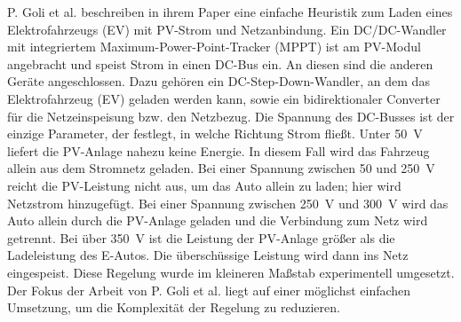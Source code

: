P. Goli et al. beschreiben in ihrem Paper eine einfache Heuristik zum Laden eines Elektrofahrzeugs (EV) mit PV-Strom und Netzanbindung. Ein DC/DC-Wandler mit integriertem Maximum-Power-Point-Tracker (MPPT) ist am PV-Modul angebracht und speist Strom in einen DC-Bus ein. An diesen sind die anderen Geräte angeschlossen. Dazu gehören ein DC-Step-Down-Wandler, an dem das Elektrofahrzeug (EV) geladen werden kann, sowie ein bidirektionaler Converter für die Netzeinspeisung bzw. den Netzbezug. Die Spannung des DC-Busses ist der einzige Parameter, der festlegt, in welche Richtung Strom fließt. Unter 50~V liefert die PV-Anlage nahezu keine Energie. In diesem Fall wird das Fahrzeug allein aus dem Stromnetz geladen. Bei einer Spannung zwischen 50 und 250~V reicht die PV-Leistung nicht aus, um das Auto allein zu laden; hier wird Netzstrom hinzugefügt. Bei einer Spannung zwischen 250~V und 300~V wird das Auto allein durch die PV-Anlage geladen und die Verbindung zum Netz wird getrennt. Bei über 350~V ist die Leistung der PV-Anlage größer als die Ladeleistung des E-Autos. Die überschüssige Leistung wird dann ins Netz eingespeist. Diese Regelung wurde im kleineren Maßstab experimentell umgesetzt. Der Fokus der Arbeit von P. Goli et al. liegt auf einer möglichst einfachen Umsetzung, um die Komplexität der Regelung zu reduzieren.\cite{goli_pv_2014} 


